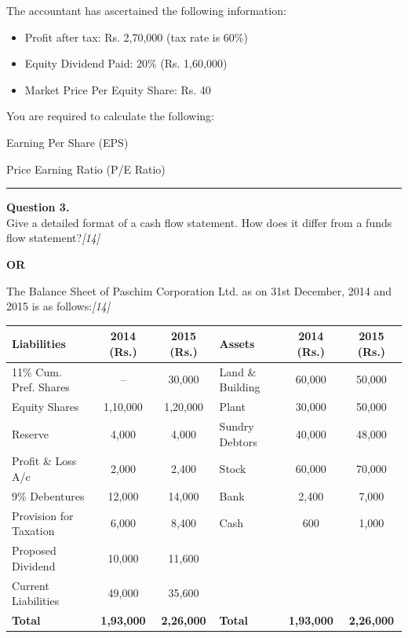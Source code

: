 \documentclass[11pt,a4paper]{article}
\newcommand{\pts}[1]{\hfill   \textit{[#1]}}
\begin{document}
\begin{parts}
  The accountant has ascertained the following information:
  
\begin{itemize}[itemsep=2pt,topsep=2pt]
    \item Profit after tax: Rs. 2,70,000 (tax rate is 60\%)
    \item Equity Dividend Paid: 20\% (Rs. 1,60,000)
    \item Market Price Per Equity Share: Rs. 40
  \end{itemize}
  You are required to calculate the following:
  
\begin{parts}
    \item Earning Per Share (EPS)
    \item Price Earning Ratio (P/E Ratio)
  \end{parts}
\end{parts}

\medskip\rule{\linewidth}{0.2pt}

\pagebreak




\noindent   \textbf{Question 3.} \\
Give a detailed format of a cash flow statement. How does it differ from a funds flow statement?\pts{14}

\centerline{   \textbf{OR}}

The Balance Sheet of Paschim Corporation Ltd. as on 31st December, 2014 and 2015 is as follows:\pts{14}


\begin{center}
\small
\renewcommand{\arraystretch}{1.2}

\begin{tabular}{|l|c|c|l|c|c|}
\hline
   \textbf{Liabilities} &   \textbf{2014 (Rs.)} &   \textbf{2015 (Rs.)} &   \textbf{Assets} &   \textbf{2014 (Rs.)} &   \textbf{2015 (Rs.)} \\ \hline
11\% Cum. Pref. Shares & -- & 30,000 & Land \& Building & 60,000 & 50,000 \\
Equity Shares & 1,10,000 & 1,20,000 & Plant & 30,000 & 50,000 \\
Reserve & 4,000 & 4,000 & Sundry Debtors & 40,000 & 48,000 \\
Profit \& Loss A/c & 2,000 & 2,400 & Stock & 60,000 & 70,000 \\
9\% Debentures & 12,000 & 14,000 & Bank & 2,400 & 7,000 \\
Provision for Taxation & 6,000 & 8,400 & Cash & 600 & 1,000 \\
Proposed Dividend & 10,000 & 11,600 & & & \\
Current Liabilities & 49,000 & 35,600 & & & \\ \hline
   \textbf{Total} &   \textbf{1,93,000} &   \textbf{2,26,000} &   \textbf{Total} &   \textbf{1,93,000} &   \textbf{2,26,000} \\ \hline
\end{tabular}
\end{center}
\end{document}

